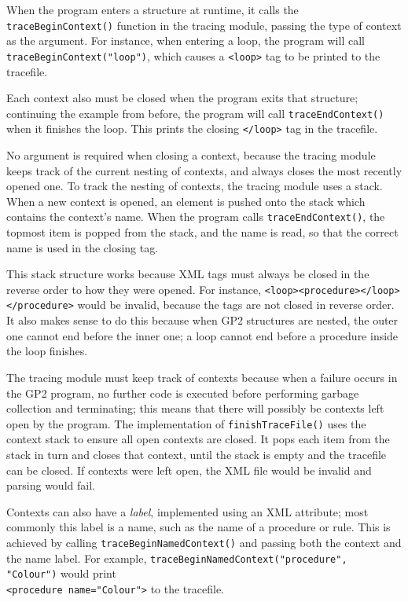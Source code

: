 \documentclass[authoryearcitations]{UoYCSproject}
\begin{document}
When the program enters a structure at runtime, it calls the \texttt{traceBeginContext()}
function in the tracing module, passing the type of context as the argument.
For instance, when entering a loop, the program will call
\texttt{traceBeginContext("loop")}, which causes a \texttt{<loop>} tag to be
printed to the tracefile.

Each context also must be closed when the program exits that structure; continuing
the example from before, the program will call \texttt{traceEndContext()} when it
finishes the loop. This prints the closing \texttt{</loop>} tag in the tracefile.

No argument is required when closing a context, because the tracing module keeps
track of the current nesting of contexts, and always closes the most recently
opened one. To track the nesting of contexts, the tracing module uses a stack.
When a new context is opened, an element is pushed onto the stack which contains
the context's name. When the program calls \texttt{traceEndContext()}, the
topmost item is popped from the stack, and the name is read, so that the correct
name is used in the closing tag.

This stack structure works because XML tags must always be closed in the reverse
order to how they were opened. For instance, \texttt{<loop><procedure></loop></procedure>}
would be invalid, because the tags are not closed in reverse order. It also makes
sense to do this because when GP2 structures are nested, the outer one cannot end
before the inner one; a loop cannot end before a procedure inside the loop finishes.

The tracing module must keep track of contexts because when a failure occurs in
the GP2 program, no further code is executed before performing garbage collection
and terminating; this means that there will possibly be contexts left open by
the program. The implementation of \texttt{finishTraceFile()} uses the context
stack to ensure all open contexts are closed. It pops each item from the stack
in turn and closes that context, until the stack is empty and the tracefile can
be closed. If contexts were left open, the XML file would be invalid and parsing
would fail.

Contexts can also have a \emph{label}, implemented using an XML attribute; most
commonly this label is a name, such as the name of a procedure or rule. This is
achieved by calling \texttt{traceBeginNamedContext()} and passing both the
context and the name label. For example, \texttt{traceBeginNamedContext("procedure", "Colour")}
would print \\
\texttt{<procedure name="Colour">} to the tracefile.
\end{document}
